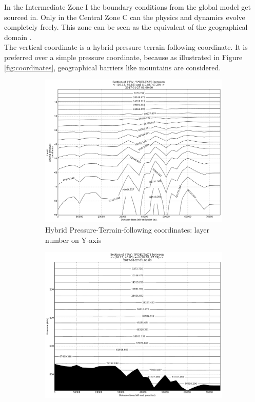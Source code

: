 In the Intermediate Zone I the boundary conditions from the global model get sourced in.
Only in the Central Zone C can the physics and dynamics evolve completely freely. This zone can be seen as the equivalent of the geographical domain \cite{gmd-2017-103}.\\
The vertical coordinate is a hybrid pressure terrain-following coordinate. It is preferred over a simple pressure coordinate, because as illustrated in Figure \ref{fig:coordinates}, geographical barriers like mountains are considered.
\begin{figure}[H]
    \centering
    \begin{subfigure}{0.45\textwidth}
    \includegraphics[trim={0cm 0cm  0cm  1.8cm },clip,width=\textwidth]{graphics/coordinates/PvsHybrid.pdf}
    \caption{\footnotesize{Hybrid Pressure-Terrain-following coordinates: layer number on Y-axis}}
    \label{fig:PvsHybrid}
    \end{subfigure}
    \hspace{1cm}
    \begin{subfigure}{0.45\textwidth}
    \includegraphics[trim={0cm 0cm  0cm  1.8cm },clip,width=\textwidth]{graphics/coordinates/PvsPressure.pdf}

\end{subfigure}
\end{figure}
